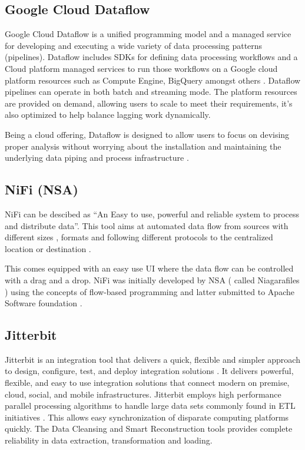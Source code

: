     \pv

\subsection{Google Cloud Dataflow \vc}
    
    Google Cloud Dataflow is a unified programming model and a managed
    service for developing and executing a wide variety of data
    processing patterns (pipelines). Dataflow includes SDKs for
    defining data processing workflows and a Cloud platform managed
    services to run those workflows on a Google cloud platform
    resources such as Compute Engine, BigQuery amongst others
    \cite{www-Dataflow}. Dataflow pipelines can operate in both batch
    and streaming mode. The platform resources are provided on demand,
    allowing users to scale to meet their requirements, it’s also
    optimized to help balance lagging work dynamically.

    Being a cloud offering, Dataflow is designed to allow users to focus
    on devising proper analysis without worrying about the installation
    and maintaining the underlying data
    piping and process infrastructure \cite{www-GoogleLiveStream}.

    \pv
    
\subsection{NiFi (NSA)}

    NiFi can be descibed as ``An Easy to use, powerful and
    reliable system to process and distribute data''\cite{www-nifi}.
    This tool aims
    at automated data flow from sources with different sizes , formats
    and following different protocols to the centralized location or
    destination \cite{www-hortanworks}.
    
    This comes equipped with an easy use UI where the data flow can be
    controlled with a drag and a drop.  NiFi was initially developed
    by NSA ( called Niagarafiles ) using the concepts of flow-based
    programming and latter submitted to Apache Software
    foundation \cite{www-forbes}.


    \pv

\subsection{Jitterbit}

    Jitterbit is an integration tool that delivers a
    quick, flexible and simpler approach to design, configure, test,
    and deploy integration solutions \cite{datasheet}.
    It delivers powerful, flexible,
    and easy to use integration solutions that connect modern on
    premise, cloud, social, and mobile infrastructures. Jitterbit
    employs high performance parallel processing algorithms to handle
    large data sets commonly found in ETL initiatives
    \cite{www-jitetl}. This allows easy synchronization of disparate
    computing platforms quickly. The Data Cleansing and Smart
    Reconstruction tools provides complete reliability in data
    extraction, transformation and loading.

